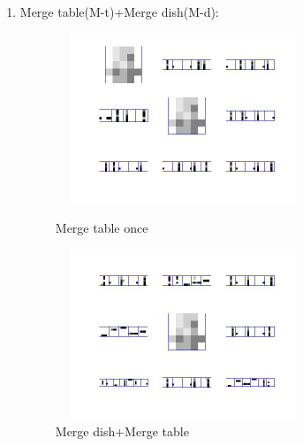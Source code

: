\documentclass{article}
\begin{document}
\begin{spacing}{1.1}
\begin{enumerate}
\item Merge table(M-t)+Merge dish(M-d):\\
\begin{figure}[h] 
  \begin{minipage}[b]{0.5\textwidth} 
    \centering 
    \includegraphics[width=3in,height=2in]{bu_mt.jpg} 
    \caption{Merge table once}
    \label{fig:by:table} 
  \end{minipage}%
  \begin{minipage}[b]{0.5\textwidth} 
    \centering 
    \includegraphics[width=3in,height=2in]{bu_md_mt.jpg} 
    \caption{Merge dish+Merge table}
    \label{fig:by:table}  
   \end{minipage}%
\end{figure}


\end{enumerate}
\end{spacing}
\end{document}
